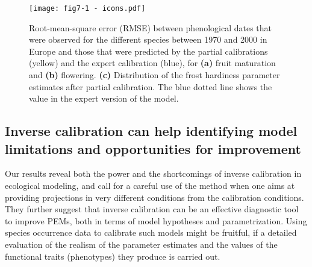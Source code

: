 \documentclass[letterpaper,8pt]{extarticle}  %
\begin{document}
\begin{doublespacing}
\begin{linenumbers}
\begin{figure}[h]
\hspace*{-1cm}
\centering
\begin{subcaptiongroup}
\label{fig:5A} 
\label{fig:5B}
\label{fig:5C}
\end{subcaptiongroup}
\texttt{[image: fig7-1 - icons.pdf]}
\caption{Root-mean-square error (RMSE) between phenological dates that were observed for the different species between 1970 and 2000 in Europe and those that were predicted by the partial calibrations (yellow) and the expert calibration (blue), for \textbf{(a)} fruit maturation and \textbf{(b)} flowering. \textbf{(c)} Distribution of the frost hardiness parameter estimates after partial calibration. The blue dotted line shows the value in the expert version of the model.}
\label{fig:5}
\end{figure}


\subsection{Inverse calibration can help identifying model limitations and opportunities for improvement}

Our results reveal both the power and the shortcomings of inverse calibration in ecological modeling, and call for a careful use of the method when one aims at providing projections in very different conditions from the calibration conditions. They further suggest that inverse calibration can be an effective diagnostic tool to improve PEMs, both in terms of model hypotheses and parametrization. Using species occurrence data to calibrate such models might be fruitful, if a detailed evaluation of the realism of the parameter estimates and the values of the functional traits (phenotypes) they produce is carried out.


\end{linenumbers}
\end{doublespacing}
\end{document}
